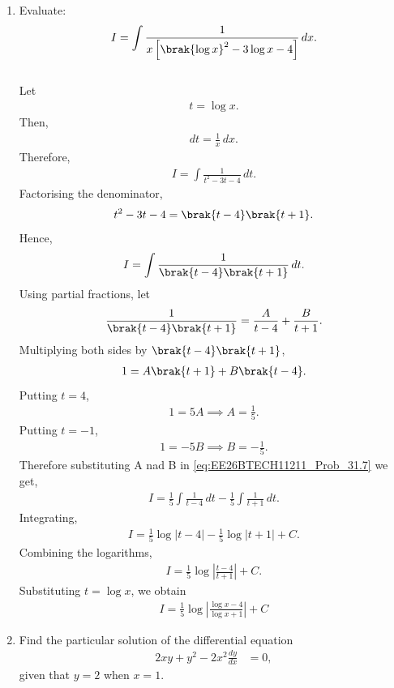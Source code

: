 \begin{enumerate}[label=\thesubsection.\arabic*, ref=\thesubsection.\theenumi]
\item
Evaluate:
\begin{align}
I=\int\frac{1}{x\left[\brak{\log x}^2-3\log x-4\right]}\,dx.
\end{align}
\solution
\\Let
\begin{align}
t=\log x.
\end{align}
Then,
\begin{align}
dt=\frac{1}{x}\,dx.
\end{align}
Therefore,
\begin{align}
I=\int\frac{1}{t^2-3t-4}\,dt.
\end{align}
Factorising the denominator,
\begin{align}
t^2-3t-4=\brak{t-4}\brak{t+1}.
\end{align}
Hence,
\begin{align}
I=\int\frac{1}{\brak{t-4}\brak{t+1}}\,dt.
\end{align}
Using partial fractions, let
\begin{align}
\frac{1}{\brak{t-4}\brak{t+1}}
=\frac{A}{t-4}+\frac{B}{t+1}.\label{eq:EE26BTECH11211_Prob_31.7}
\end{align}
Multiplying both sides by $\brak{t-4}\brak{t+1}$,
\begin{align}
1=A\brak{t+1}+B\brak{t-4}.
\end{align}
Putting $t=4$,
\begin{align}
1=5A
\implies A=\frac{1}{5}.
\end{align}
Putting $t=-1$,
\begin{align}
1=-5B
\implies B=-\frac{1}{5}.
\end{align}
Therefore substituting A nad B in \eqref{eq:EE26BTECH11211_Prob_31.7} we get,
\begin{align}
I=\frac{1}{5}\int\frac{1}{t-4}\,dt
-\frac{1}{5}\int\frac{1}{t+1}\,dt.
\end{align}
Integrating,
\begin{align}
I=\frac{1}{5}\log|t-4|
-\frac{1}{5}\log|t+1|+C.
\end{align}
Combining the logarithms,
\begin{align}
I=\frac{1}{5}\log\left|
\frac{t-4}{t+1}
\right|+C.
\end{align}
Substituting $t=\log x$, we obtain
\begin{align}
I=\frac{1}{5}\log\left|
\frac{\log x-4}{\log x+1}
\right|+C
\end{align}

\item
Find the particular solution of the differential equation
\begin{align}
2xy+y^2-2x^2\frac{dy}{dx}&=0,
\label{eq:EE26BTECH11211_Prob_1.2.32.0}
\end{align}
given that $y=2$ when $x=1$.


\end{enumerate}
